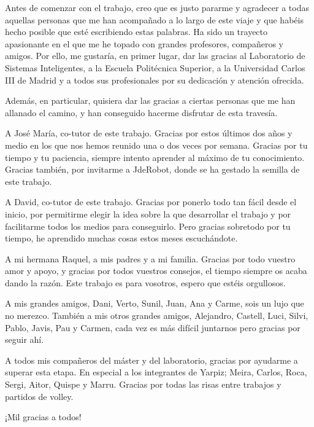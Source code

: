Antes de comenzar con el trabajo, creo que es justo pararme y agradecer a todas aquellas personas que me han acompañado a lo largo de este viaje y que habéis hecho posible que esté escribiendo estas palabras. Ha sido un trayecto apasionante en el que me he topado con grandes profesores, compañeros y amigos. Por ello, me gustaría, en primer lugar, dar las gracias al Laboratorio de Sistemas Inteligentes, a la Escuela Politécnica Superior, a la Universidad Carlos III de Madrid y a todos sus profesionales por su dedicación y atención ofrecida.

Además, en particular, quisiera dar las gracias a ciertas personas que me han allanado el camino, y han conseguido hacerme disfrutar de esta travesía. 

A José María, co-tutor de este trabajo. Gracias por estos últimos dos años y medio en los que nos hemos reunido una o dos veces por semana. Gracias por tu tiempo y tu paciencia, siempre intento aprender al máximo de tu conocimiento. Gracias también, por invitarme a JdeRobot, donde se ha gestado la semilla de este trabajo.

A David, co-tutor de este trabajo. Gracias por ponerlo todo tan fácil desde el inicio, por permitirme elegir la idea sobre la que desarrollar el trabajo y por facilitarme todos los medios para conseguirlo. Pero gracias sobretodo por tu tiempo, he aprendido muchas cosas estos meses escuchándote.

A mi hermana Raquel, a mis padres y a mi familia. Gracias por todo vuestro amor y apoyo, y gracias por todos vuestros consejos, el tiempo siempre os acaba dando la razón. Este trabajo es para vosotros, espero que estéis orgullosos.

A mis grandes amigos, Dani, Verto, Sunil, Juan, Ana y Carme, sois un lujo que no merezco. También a mis otros grandes amigos, Alejandro, Castell, Luci, Silvi, Pablo, Javis, Pau y Carmen, cada vez es más difícil juntarnos pero gracias por seguir ahí. 

A todos mis compañeros del máster y del laboratorio, gracias por ayudarme a superar esta etapa. En especial a los integrantes de Yarpiz; Meira, Carlos, Roca, Sergi, Aitor, Quispe y Marru. Gracias por todas las risas entre trabajos y partidos de volley.

\begin{center}
    ¡Mil gracias a todos!
\end{center}